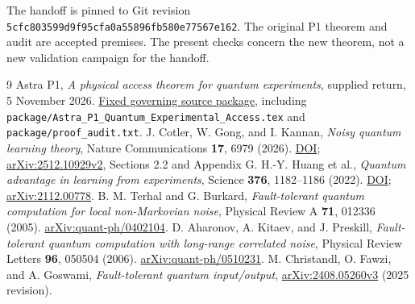 \documentclass[11pt,a4paper]{article}
\begin{document}
The handoff is pinned to Git revision \texttt{5cfc803599d9f95cfa0a55896fb580e77567e162}. The original P1 theorem and audit are accepted premises. The present checks concern the new theorem, not a new validation campaign for the handoff.

\begingroup
\small\setlength{\parskip}{2pt}
\begin{thebibliography}{9}
 Astra P1, \emph{A physical access theorem for quantum experiments}, supplied return, 5 November 2026. \href{https://github.com/harjassand/astra-research-knowledge/tree/5cfc803599d9f95cfa0a55896fb580e77567e162/research/returns/2026-11-05-p1-experimental-access}{Fixed governing source package}, including \texttt{package/Astra\_P1\_Quantum\_Experimental\_Access.tex} and \texttt{package/proof\_audit.txt}.
 J. Cotler, W. Gong, and I. Kannan, \emph{Noisy quantum learning theory}, Nature Communications \textbf{17}, 6979 (2026). \href{https://doi.org/10.1038/s41467-026-73693-x}{DOI}; \href{https://arxiv.org/html/2512.10929v2}{arXiv:2512.10929v2}, Sections 2.2 and Appendix G.
 H.-Y. Huang et al., \emph{Quantum advantage in learning from experiments}, Science \textbf{376}, 1182--1186 (2022). \href{https://doi.org/10.1126/science.abn7293}{DOI}; \href{https://arxiv.org/abs/2112.00778}{arXiv:2112.00778}.
 B. M. Terhal and G. Burkard, \emph{Fault-tolerant quantum computation for local non-Markovian noise}, Physical Review A \textbf{71}, 012336 (2005). \href{https://arxiv.org/abs/quant-ph/0402104}{arXiv:quant-ph/0402104}.
 D. Aharonov, A. Kitaev, and J. Preskill, \emph{Fault-tolerant quantum computation with long-range correlated noise}, Physical Review Letters \textbf{96}, 050504 (2006). \href{https://arxiv.org/abs/quant-ph/0510231}{arXiv:quant-ph/0510231}.
 M. Christandl, O. Fawzi, and A. Goswami, \emph{Fault-tolerant quantum input/output}, \href{https://arxiv.org/abs/2408.05260v3}{arXiv:2408.05260v3} (2025 revision).
\end{thebibliography}
\endgroup
\end{document}
